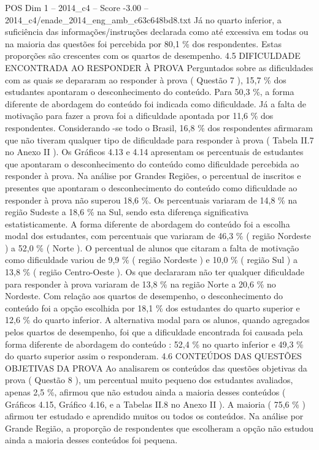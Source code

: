 \begin{textsample}{POS Dim 1 – 2014\_c4 – Score -3.00 – 2014\_c4/enade\_2014\_eng\_amb\_c63c648bd8.txt}
Já no quarto inferior, a suficiência das informações/instruções declarada como até excessiva em todas ou na maioria das questões foi percebida por 80,1 \% dos respondentes.
Estas proporções são crescentes com os quartos de desempenho. 4.5 DIFICULDADE ENCONTRADA AO RESPONDER À PROVA Perguntados sobre as dificuldades com as quais se depararam ao responder à prova ( Questão 7 ), 15,7 \% dos estudantes apontaram o desconhecimento do conteúdo.
Para 50,3 \%, a forma diferente de abordagem do conteúdo foi indicada como dificuldade.
Já a falta de motivação para fazer a prova foi a dificuldade apontada por 11,6 \% dos respondentes.
Considerando -se todo o Brasil, 16,8 \% dos respondentes afirmaram que não tiveram qualquer tipo de dificuldade para responder à prova ( Tabela II.7 no Anexo II ).
Os Gráficos 4.13 e 4.14 apresentam os percentuais de estudantes que apontaram o desconhecimento do conteúdo como dificuldade percebida ao responder à prova.
Na análise por Grandes Regiões, o percentual de inscritos e presentes que apontaram o desconhecimento do conteúdo como dificuldade ao responder à prova não superou 18,6 \%.
Os percentuais variaram de 14,8 \% na região Sudeste a 18,6 \% na Sul, sendo esta diferença significativa estatisticamente.
A forma diferente de abordagem do conteúdo foi a escolha modal dos estudantes, com percentuais que variaram de 46,3 \% ( região Nordeste ) a 52,0 \% ( Norte ).
O percentual de alunos que citaram a falta de motivação como dificuldade variou de 9,9 \% ( região Nordeste ) e 10,0 \% ( região Sul ) a 13,8 \% ( região Centro-Oeste ).
Os que declararam não ter qualquer dificuldade para responder à prova variaram de 13,8 \% na região Norte a 20,6 \% no Nordeste.
Com relação aos quartos de desempenho, o desconhecimento do conteúdo foi a opção escolhida por 18,1 \% dos estudantes do quarto superior e 12,6 \% do quarto inferior.
A alternativa modal para os alunos, quando agregados pelos quartos de desempenho, foi que a dificuldade encontrada foi causada pela forma diferente de abordagem do conteúdo : 52,4 \% no quarto inferior e 49,3 \% do quarto superior assim o responderam. 4.6 CONTEÚDOS DAS QUESTÕES OBJETIVAS DA PROVA Ao analisarem os conteúdos das questões objetivas da prova ( Questão 8 ), um percentual muito pequeno dos estudantes avaliados, apenas 2,5 \%, afirmou que não estudou ainda a maioria desses conteúdos ( Gráficos 4.15, Gráfico 4.16, e a Tabelas II.8 no Anexo II ).
A maioria ( 75,6 \% ) afirmou ter estudado e aprendido muitos ou todos os conteúdos.
Na análise por Grande Região, a proporção de respondentes que escolheram a opção não estudou ainda a maioria desses conteúdos foi pequena.

\end{textsample}

